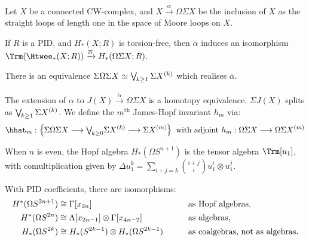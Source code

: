 \fi
\begin{SummaryNote}
Let $X$ be a connected CW-complex, and $X\xrightarrow{\alpha} \Omega\Sigma X$ be the inclusion of $X$ as the straight loops of length one in the space of Moore loops on $X$.

\Bullet If $R$ is a PID, and $H_*(X; R)$ is torsion-free, then $\alpha$ induces an isomorphism $\Trm (\Htwee_*(X; R)) \xrightarrow{\overline \alpha} H_*(\Loops \Suspend X; R)$.

\Bullet There is an equivalence
$\Sigma \Omega \Sigma X \simeq \bigvee_{\!k \ge 1} \Sigma X^{(k)}$ which realises $\overline\alpha$.

\Bullet The extension of $\alpha$ to $J(X)\xrightarrow{\tilde\alpha}\Omega\Sigma X$ is a homotopy equivalence. $\Sigma J(X)$ splits as $\bigvee_{\!k \ge 1} \Sigma X^{(k)}$. We define the $m^\text{th}$ James-Hopf invariant $h_m$ via:
\[\hhat_m:\left\{\Sigma\Omega\Sigma X\to{\textstyle\bigvee_{\!k \ge 0}} \Suspend X^{(k)}\to\Sigma X^{(m)}\right\}\text{ with adjoint }h_m:\Omega\Sigma X\to\Omega\Sigma X^{(m)}\]

\Bullet When $n$ is even, the Hopf algebra $H_*(\Omega S^{n+1})$ is the tensor algebra $\Trm[u_1]$, with comultiplication given by $\Delta u_1^k = {\displaystyle\sum_{i + j = k}} \binom{i+j}{i} u_1^i \otimes u_1 ^j$.

\Bullet With PID coefficients, there are isomorphisms:
\begin{alignat*}{2}
H^* (\Omega S^{2n+1}) & \cong \Gamma[x_{2n}]&\qquad&\text{as Hopf algebras}, \\
H^* (\Omega S^{2n}) & \cong \Lambda[x_{2n-1}] \otimes \Gamma[x_{4n-2}]&&\text{as algebras}, \\
H_* (\Omega S^{2k}) & \cong H_*( S^{2k-1}) \otimes H_* (\Omega S^{2k-1})&&\text{as coalgebras, not as algebras.}
\end{alignat*}
\end{SummaryNote}

